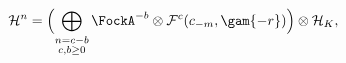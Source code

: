 \begin{equation}
%
{\cal H}^{n} =
\Bigl(
\bigoplus_{\stackrel{\scriptstyle n=c-b}{c, b \geq 0}}
\FockA^{-b} \otimes {\cal F}^{c}(c_{-m}, \gam{-r})
\Bigr) \otimes {\cal H}_{K},
%
\end{equation}

